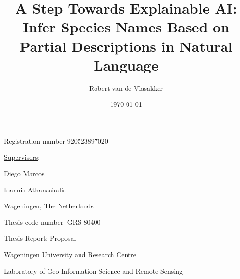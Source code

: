 \documentclass[a4paper, 12pt, oneside]{book} %
\title{A Step Towards Explainable AI: Infer Species Names Based on Partial Descriptions in Natural Language}
\author{Robert van de Vlasakker}
\date{\today}
\begin{document}
 \begin{titlingpage}


  \thispagestyle{empty}
  
  \begin{center}
  {\bfseries \Large \thetitle}
  \newline
  \newline
  \newline
  \newline
  
  {\Large \theauthor}\vspace{0.8cm}
  
  {Registration number 920523897020}\vspace{2.5cm}
  
  {\large \underline{Supervisors}:}\vspace{1.1cm}
  
  {Diego Marcos}
  
  {Ioannis Athanasiadis}\vspace{3.0cm}
  
  
  
  \end{center}
  
  \begin{center}
    {\thedate}
  
    {Wageningen, The Netherlands}
  \end{center}\vspace{6cm}

    Thesis code number: GRS-80400
  
    Thesis Report: Proposal
  
    {Wageningen University and Research Centre}
  
    {Laboratory of Geo-Information Science and Remote Sensing}
 \end{titlingpage}
\graphicspath{ {./figures/} }

\renewcommand{\thesection}{\arabic{section}}
\end{document}
